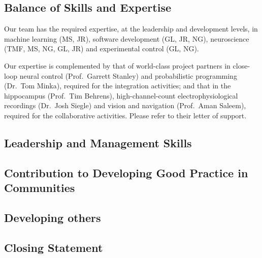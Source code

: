\subsection*{Balance of Skills and Expertise}

Our team has the required expertise, at the leadership and development levels,
in machine learning (MS, JR), software development (GL, JR, NG), neuroscience
(TMF, MS, NG, GL, JR) and experimental control (GL, NG).

Our expertise is complemented by that of world-class project partners in
close-loop neural control (Prof.~Garrett Stanley) and probabilistic programming
(Dr.~Tom Minka), required for the integration activities; and that in
the hippocampus (Prof.~Tim Behrens), high-channel-count electrophysiological
recordings (Dr.~Josh Siegle) and vision and navigation (Prof.~Aman Saleem),
required for the collaborative activities. Please refer to their letter of
support.

\subsection*{Leadership and Management Skills}

\subsection*{Contribution to Developing Good Practice in Communities}

\subsection*{Developing others}

\subsection*{Closing Statement}

